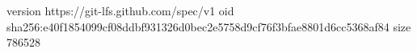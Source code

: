 version https://git-lfs.github.com/spec/v1
oid sha256:e40f1854099cf08ddbf931326d0bec2e5758d9cf76f3bfae8801d6cc5368af84
size 786528
